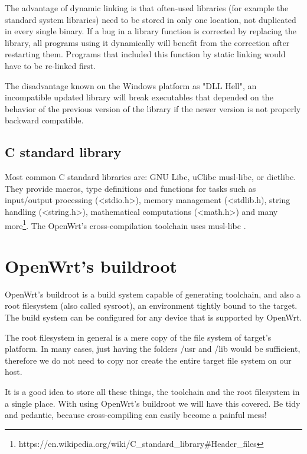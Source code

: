 The advantage of dynamic linking is that often-used libraries (for example the standard system libraries) need to be stored in only one location, not duplicated in every single binary.
If a bug in a library function is corrected by replacing the library, all programs using it dynamically will benefit from the correction after restarting them.
Programs that included this function by static linking would have to be re-linked first.

The disadvantage known on the Windows platform as "DLL Hell", an incompatible updated library will break executables that depended on the behavior of the previous version of the library if the newer version is not properly backward compatible\cite{compiler}.



\subsection{C standard library}

Most common C standard libraries are: GNU Libc, uClibc musl-libc, or dietlibc.
They provide macros, type definitions and functions for tasks such as input/output processing (<stdio.h>), memory management (<stdlib.h), string handling (<string.h>), mathematical computations (<math.h>) and many more\footnote{https://en.wikipedia.org/wiki/C\_standard\_library\#Header\_files}.
The OpenWrt's cross-compilation toolchain uses musl-libc \cite{c_library}.



\section{OpenWrt's buildroot}

OpenWrt's buildroot is a build system capable of generating toolchain, and also a root filesystem (also called sysroot), an environment tightly bound to the target.
The build system can be configured for any device that is supported by OpenWrt. %

The root filesystem in general is a mere copy of the file system of target's platform.
In many cases, just having the folders /usr and /lib would be sufficient, therefore we do not need to copy nor create the entire target file system on our host.

It is a good idea to store all these things, the toolchain and the root filesystem in a single place.
With using OpenWrt's buildroot we will have this covered.
Be tidy and pedantic, because cross-compiling can easily become a painful mess!\cite{fabrizio}




